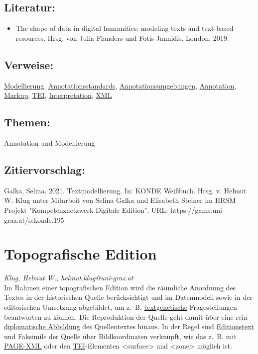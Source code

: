 \documentclass{article}
\begin{document}
        \subsection*{Literatur:}\begin{itemize}\item The shape of data in digital humanities: modeling texts and text-based resources. Hrsg. von Julia Flanders und Fotis Jannidis. London: 2019.\end{itemize}\subsection*{Verweise:}\href{https://gams.uni-graz.at/o:konde.137}{Modellierung}, \href{https://gams.uni-graz.at/o:konde.29}{Annotationsstandards}, \href{https://gams.uni-graz.at/o:konde.30}{Annotationsumgebungen}, \href{https://gams.uni-graz.at/o:konde.17}{Annotation}, \href{https://gams.uni-graz.at/o:konde.126}{Markup}, \href{https://gams.uni-graz.at/o:konde.178}{TEI}, \href{https://gams.uni-graz.at/o:konde.100}{Interpretation}, \href{https://gams.uni-graz.at/o:konde.215}{XML}\subsection*{Themen:}Annotation und Modellierung\subsection*{Zitiervorschlag:}Galka, Selina. 2021. Textmodellierung. In: KONDE Weißbuch. Hrsg. v. Helmut W. Klug unter Mitarbeit von Selina Galka und Elisabeth Steiner im HRSM Projekt "Kompetenznetzwerk Digitale Edition". URL: https://gams.uni-graz.at/o:konde.195\newpage\section*{Topografische Edition} \emph{Klug, Helmut W.; helmut.klug@uni-graz.at }\\
        
    Im Rahmen einer topografischen Edition wird die räumliche Anordnung des Textes in der historischen Quelle berücksichtigt und im Datenmodell sowie in der editorischen Umsetzung abgebildet, um z. B. \href{http://gams.uni-graz.at/o:konde.28}{textgenetische} Fragestellungen beantworten zu können. Die Reproduktion der Quelle geht damit über eine rein \href{http://gams.uni-graz.at/o:konde.66}{diplomatische Abbildung} des Quellentextes hinaus. In der Regel sind \href{http://gams.uni-graz.at/o:konde.75}{Editionstext} und Faksimile der Quelle über Bildkoordinaten verknüpft, wie das z. B. mit \href{http://gams.uni-graz.at/o:konde.154}{PAGE-XML} oder den \href{http://gams.uni-graz.at/o:konde.178}{TEI}-Elementen <surface> und <zone> möglich ist.\\
            
\end{document}
